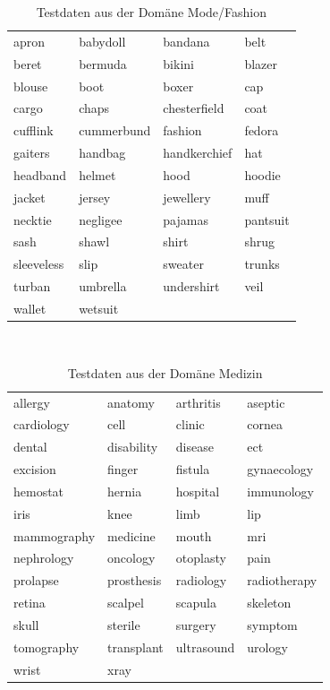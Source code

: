 \documentclass[12pt,a4paper]{report}
\begin{document}
\begin{table}[H]
\caption{Testdaten aus der Domäne Mode/Fashion}
\begin{center}

\begin{tabular}{l|l|l|l}
apron & babydoll & bandana & belt\\
beret & bermuda & bikini & blazer\\
blouse & boot & boxer & cap\\
cargo & chaps & chesterfield & coat\\
cufflink & cummerbund & fashion & fedora\\
gaiters & handbag & handkerchief & hat\\
headband & helmet & hood & hoodie\\
jacket & jersey & jewellery & muff\\
necktie & negligee & pajamas & pantsuit\\
sash & shawl & shirt & shrug\\
sleeveless & slip & sweater & trunks\\
turban & umbrella & undershirt & veil\\
wallet & wetsuit &  & \\
\end{tabular}\\

\end{center}
\end{table}


\begin{table}[H]
\caption{Testdaten aus der Domäne Medizin}
\begin{center}
\begin{tabular}{l|l|l|l}
allergy & anatomy & arthritis & aseptic\\
cardiology & cell & clinic & cornea\\
dental & disability & disease & ect\\
excision & finger & fistula & gynaecology\\
hemostat & hernia & hospital & immunology\\
iris & knee & limb & lip\\
mammography & medicine & mouth & mri\\
nephrology & oncology & otoplasty & pain\\
prolapse & prosthesis & radiology & radiotherapy\\
retina & scalpel & scapula & skeleton\\
skull & sterile & surgery & symptom\\
tomography & transplant & ultrasound & urology\\
wrist & xray &  & \\
\end{tabular}\\
\end{center}
\end{table}
\end{document}
